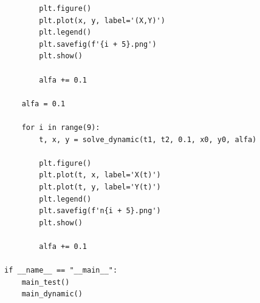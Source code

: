 \documentclass[a4paper,14pt]{extreport}
\begin{document}
\begin{verbatim}
        plt.figure()
        plt.plot(x, y, label='(X,Y)')
        plt.legend()
        plt.savefig(f'{i + 5}.png')
        plt.show()
        
        alfa += 0.1

    alfa = 0.1

    for i in range(9):
        t, x, y = solve_dynamic(t1, t2, 0.1, x0, y0, alfa)

        plt.figure()
        plt.plot(t, x, label='X(t)')
        plt.plot(t, y, label='Y(t)')
        plt.legend()
        plt.savefig(f'n{i + 5}.png')
        plt.show()
        
        alfa += 0.1

if __name__ == "__main__":
    main_test()
    main_dynamic()

    
\end{verbatim}
\end{document}
